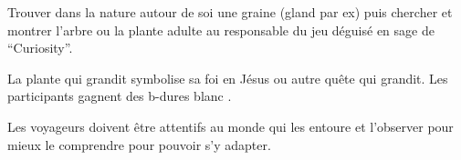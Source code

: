 \documentclass{grand-jeu}
\begin{document}
\begin{regles}
Trouver dans la nature autour de soi une graine (gland par ex) puis chercher et montrer l’arbre ou la plante adulte au responsable du jeu déguisé en sage de “Curiosity”.

La plante qui grandit symbolise sa foi en Jésus ou autre quête qui grandit. Les participants gagnent des b-dures blanc . 

\end{regles}

\begin{imaginaire}
Les voyageurs doivent être attentifs au monde qui les entoure et l'observer pour mieux le comprendre pour pouvoir s'y adapter. 
\end{imaginaire}

\begin{moments-stop}
\end{moments-stop}
\end{document}
